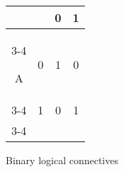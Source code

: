\begin{figure}
{\begin{tabular}{cccc}
					&  & 0 & 1 \\ \cline{3-4}

					\multirow{2}{*}A & 0 &   \multicolumn{1}{|c|}{1} & \multicolumn{1}{c|}{0}    \\ \cline{3-4}

					 & 1 &                               \multicolumn{1}{|c|}{0} & \multicolumn{1}{c|}{1}     \\ \cline{3-4}
					
				\end{tabular}}%

			\caption{Binary logical connectives}
			\label{logical_connectives}
			\end{figure}